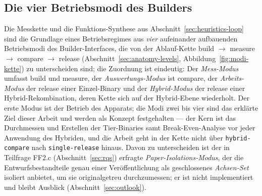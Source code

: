 \begin{nurkurz}
\subsection{Die vier Betriebsmodi des Builders}\label{sec:heuristics-modes}
Die Messkette und die Funktions-Synthese aus Abschnitt~\ref{sec:heuristics-loop} sind die Grundlage
eines Betriebsregimes aus \emph{vier} aufeinander aufbauenden Betriebsmodi
des Builder-Interfaces, die von der Ablauf-Kette build $\to$ measure $\to$ compare $\to$ release
(Abschnitt~\ref{sec:anatomy-levels}, Abbildung~\ref{fig:modi-kette}) zu unterscheiden sind; die Zuordnung ist
eindeutig: Der \emph{Mess-Modus} umfasst build und measure, der \emph{Auswertungs-Modus} ist compare, der
\emph{Arbeits-Modus} der release einer Einzel-Binary und der \emph{Hybrid-Modus} der release einer
Hybrid-Rekombination, deren Kette sich auf der Hybrid-Ebene wiederholt. Der erste Modus ist der Betrieb des
Apparats; die Modi zwei bis vier sind das erklärte Ziel dieser Arbeit und werden als Konzept festgehalten ---
der Kern ist das Durchmessen und Erstellen der Tier-Binaries samt Break-Even-Analyse vor jeder Anwendung des
Hybriden, und die Arbeit geht in der Kette nicht über \texttt{hybrid-compare} nach \texttt{single-release}
hinaus. Davon zu unterscheiden ist der in Teilfrage FF2.c (Abschnitt~\ref{sec:rqs}) erfragte
\emph{Paper-Isolations-Modus}, der die Entwurfsbestandteile genau einer Veröffentlichung als geschlossenes
\emph{Achsen-Set} isoliert anbietet, um sie originalgetreu durchzumessen; er ist nicht implementiert und bleibt
Ausblick (Abschnitt~\ref{sec:outlook}).
\end{nurkurz}

